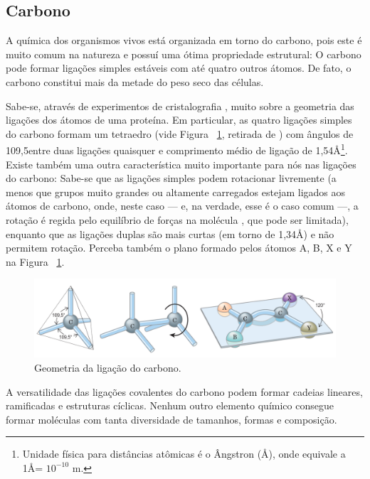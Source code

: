 \documentclass[a4paper,12pt]{article}
\begin{document}
	\subsection{Carbono}
	A química dos organismos vivos está organizada em torno do carbono, pois este é muito comum na natureza e possuí uma ótima propriedade estrutural: O carbono pode formar ligações simples estáveis com até quatro outros átomos. De fato, o carbono constitui mais da metade do peso seco das células. 
	
	Sabe-se, através de experimentos de cristalografia \cite{ramachandran1974MolStructure}, muito sobre a geometria das ligações dos átomos de uma proteína. Em particular, as quatro ligações simples do carbono formam um tetraedro (vide Figura ~\ref{fig:carbono}, retirada de \cite{bioquimicaLehninger}) com ângulos de 109,5\textdegree entre duas ligações quaisquer e comprimento médio de ligação de 1,54\AA\footnote[1]{Unidade física para distâncias atômicas é o Ângstron (\AA), onde equivale a 1\AA = $10^{-10}$ m.}. Existe também uma outra característica muito importante para nós nas ligações do carbono: Sabe-se que as ligações simples podem rotacionar livremente (a menos que grupos muito grandes ou altamente carregados estejam ligados aos átomos de carbono, onde, neste caso --- e, na verdade, esse é o caso comum ---, a rotação é regida pelo equilíbrio de forças na molécula \cite{carlileTese}, que pode ser limitada), enquanto que as ligações duplas são mais curtas (em torno de 1,34\AA) e não permitem rotação. Perceba também o plano formado pelos átomos A, B, X e Y na Figura ~\ref{fig:carbono}.

	\begin{figure}[H]
		\begin{center}
			\includegraphics[width=1\linewidth]{carbono.png}
		\end{center}
		\caption{Geometria da ligação do carbono.}
		\label{fig:carbono}
	\end{figure}

	A versatilidade das ligações covalentes do carbono podem formar cadeias lineares, ramificadas e estruturas cíclicas. Nenhum outro elemento químico consegue formar moléculas com tanta diversidade de tamanhos, formas e composição.
	
\end{document}
